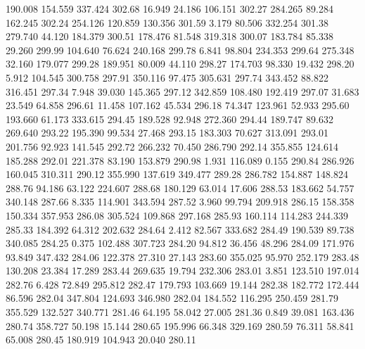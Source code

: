 190.008  154.559  337.424       302.68
  16.949   24.186  106.151       302.27
 284.265   89.284  162.245       302.24
 254.126  120.859  130.356       301.59
   3.179   80.506  332.254       301.38
 279.740   44.120  184.379       300.51
 178.476   81.548  319.318       300.07
 183.784   85.338   29.260       299.99
 104.640   76.624  240.168       299.78
   6.841   98.804  234.353       299.64
 275.348   32.160  179.077       299.28
 189.951   80.009   44.110       298.27
 174.703   98.330   19.432       298.20
   5.912  104.545  300.758       297.91
 350.116   97.475  305.631       297.74
 343.452   88.822  316.451       297.34
   7.948   39.030  145.365       297.12
 342.859  108.480  192.419       297.07
  31.683   23.549   64.858       296.61
  11.458  107.162   45.534       296.18
  74.347  123.961   52.933       295.60
 193.660   61.173  333.615       294.45
 189.528   92.948  272.360       294.44
 189.747   89.632  269.640       293.22
 195.390   99.534   27.468       293.15
 183.303   70.627  313.091       293.01
 201.756   92.923  141.545       292.72
 266.232   70.450  286.790       292.14
 355.855  124.614  185.288       292.01
 221.378   83.190  153.879       290.98
   1.931  116.089    0.155       290.84
 286.926  160.045  310.311       290.12
 355.990  137.619  349.477       289.28
 286.782  154.887  148.824       288.76
  94.186   63.122  224.607       288.68
 180.129   63.014   17.606       288.53
 183.662   54.757  340.148       287.66
   8.335  114.901  343.594       287.52
   3.960   99.794  209.918       286.15
 158.358  150.334  357.953       286.08
 305.524  109.868  297.168       285.93
 160.114  114.283  244.339       285.33
 184.392   64.312  202.632       284.64
   2.412   82.567  333.682       284.49
 190.539   89.738  340.085       284.25
   0.375  102.488  307.723       284.20
  94.812   36.456   48.296       284.09
 171.976   93.849  347.432       284.06
 122.378   27.310   27.143       283.60
 355.025   95.970  252.179       283.48
 130.208   23.384   17.289       283.44
 269.635   19.794  232.306       283.01
   3.851  123.510  197.014       282.76
   6.428   72.849  295.812       282.47
 179.793  103.669   19.144       282.38
 182.772  172.444   86.596       282.04
 347.804  124.693  346.980       282.04
 184.552  116.295  250.459       281.79
 355.529  132.527  340.771       281.46
  64.195   58.042   27.005       281.36
   0.849   39.081  163.436       280.74
 358.727   50.198   15.144       280.65
 195.996   66.348  329.169       280.59
  76.311   58.841   65.008       280.45
 180.919  104.943   20.040       280.11
